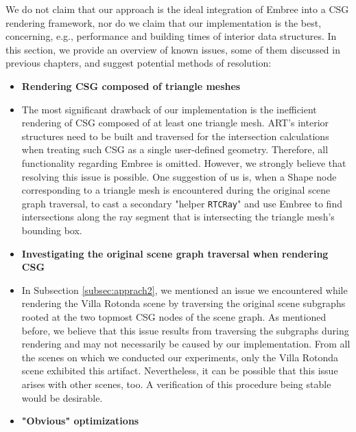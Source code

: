 We do not claim that our approach is the ideal integration of Embree into a CSG rendering framework, nor do we claim that our implementation is the best, concerning, e.g., performance and building times of interior data structures.
In this section, we provide an overview of known issues, some of them discussed in previous chapters, and suggest potential methods of resolution:
\\

\begin{itemize}
	\setlength\itemsep{0.05em}
	
	\item \textbf{Rendering CSG composed of triangle meshes}
	
	\item[] The most significant drawback of our implementation is the inefficient rendering of CSG composed of at least one triangle mesh. ART's interior structures need to be built and traversed for the intersection calculations when treating such CSG as a single user-defined geometry. Therefore, all functionality regarding Embree is omitted. However, we strongly believe that resolving this issue is possible. One suggestion of us is, when a Shape node corresponding to a triangle mesh is encountered during the original scene graph traversal, to cast a secondary "helper \texttt{RTCRay}" and use Embree to find intersections along the ray segment that is intersecting the triangle mesh's bounding box.
	\\
	
	\item \textbf{Investigating the original scene graph traversal when rendering CSG}
	
	\item[] In Subsection \ref{subsec:apprach2}, we mentioned an issue we encountered while rendering the Villa Rotonda scene by traversing the original scene subgraphs rooted at the two topmost CSG nodes of the scene graph. As mentioned before, we believe that this issue results from traversing the subgraphs during rendering and may not necessarily be caused by our implementation. From all the scenes on which we conducted our experiments, only the Villa Rotonda scene exhibited this artifact. Nevertheless, it can be possible that this issue arises with other scenes, too. A verification of this procedure being stable would be desirable.
	\\
	
	\item \textbf{"Obvious" optimizations}
	

\end{itemize}
